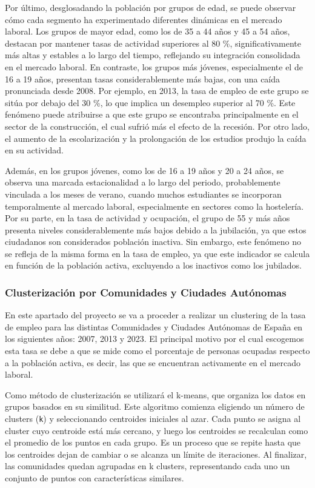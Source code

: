 \documentclass[notspecified,article,submit,moreauthors,pdftex]{Definitions/mdpi}
\begin{document}
Por último, desglosadando la población por grupos de edad, se puede
observar cómo cada segmento ha experimentado diferentes dinámicas en el
mercado laboral. Los grupos de mayor edad, como los de 35 a 44 años y 45
a 54 años, destacan por mantener tasas de actividad superiores al 80 \%,
significativamente más altas y estables a lo largo del tiempo,
reflejando su integración consolidada en el mercado laboral. En
contraste, los grupos más jóvenes, especialmente el de 16 a 19 años,
presentan tasas considerablemente más bajas, con una caída pronunciada
desde 2008. Por ejemplo, en 2013, la tasa de empleo de este grupo se
sitúa por debajo del 30 \%, lo que implica un desempleo superior al 70
\%. Este fenómeno puede atribuirse a que este grupo se encontraba
principalmente en el sector de la construcción, el cual sufrió más el
efecto de la recesión. Por otro lado, el aumento de la escolarización y
la prolongación de los estudios produjo la caída en su actividad.

Además, en los grupos jóvenes, como los de 16 a 19 años y 20 a 24 años,
se observa una marcada estacionalidad a lo largo del periodo,
probablemente vinculada a los meses de verano, cuando muchos estudiantes
se incorporan temporalmente al mercado laboral, especialmente en
sectores como la hostelería. Por su parte, en la tasa de actividad y
ocupación, el grupo de 55 y más años presenta niveles considerablemente
más bajos debido a la jubilación, ya que estos ciudadanos son
considerados población inactiva. Sin embargo, este fenómeno no se
refleja de la misma forma en la tasa de empleo, ya que este indicador se
calcula en función de la población activa, excluyendo a los inactivos
como los jubilados.

\subsubsection{Clusterización por Comunidades y Ciudades
Autónomas}\label{clusterizaciuxf3n-por-comunidades-y-ciudades-autuxf3nomas}

En este apartado del proyecto se va a proceder a realizar un clustering
de la tasa de empleo para las distintas Comunidades y Ciudades Autónomas
de España en los siguientes años: 2007, 2013 y 2023. El principal motivo
por el cual escogemos esta tasa se debe a que se mide como el porcentaje
de personas ocupadas respecto a la población activa, es decir, las que
se encuentran activamente en el mercado laboral.

Como método de clusterización se utilizará el k-means, que organiza los
datos en grupos basados en su similitud. Este algoritmo comienza
eligiendo un número de clusters (\texttt{k}) y seleccionando centroides
iniciales al azar. Cada punto se asigna al cluster cuyo centroide está
más cercano, y luego los centroides se recalculan como el promedio de
los puntos en cada grupo. Es un proceso que se repite hasta que los
centroides dejan de cambiar o se alcanza un límite de iteraciones. Al
finalizar, las comunidades quedan agrupadas en k clusters, representando
cada uno un conjunto de puntos con características similares.
\end{document}
